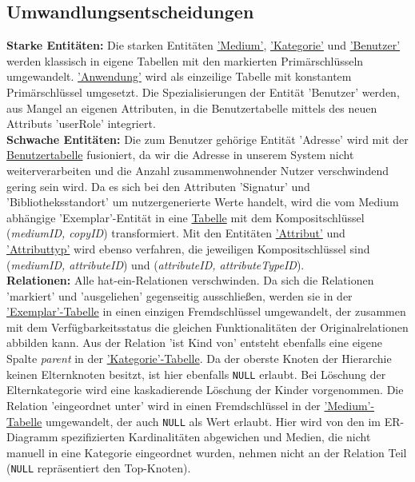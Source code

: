 \documentclass{article}
\begin{document}
\subsection{Umwandlungsentscheidungen}
\textbf{Starke Entitäten:} Die starken Entitäten \hyperlink{Medium}{'Medium'}, \hyperlink{Category}{'Kategorie'} und \hyperlink{User}{'Benutzer'} werden klassisch in eigene Tabellen mit den markierten Primärschlüsseln umgewandelt. \hyperlink{Application}{'Anwendung'} wird als einzeilige Tabelle mit konstantem Primärschlüssel umgesetzt. Die Spezialisierungen der Entität 'Benutzer' werden, aus Mangel an eigenen Attributen, in die Benutzertabelle mittels des neuen Attributs 'userRole' integriert. \\
\textbf{Schwache Entitäten:} Die zum Benutzer gehörige Entität 'Adresse' wird mit der \hyperlink{User}{Benutzertabelle} fusioniert, da wir die Adresse in unserem System nicht weiterverarbeiten und die Anzahl zusammenwohnender Nutzer verschwindend gering sein wird. Da es sich bei den Attributen 'Signatur' und 'Bibliotheksstandort' um nutzergenerierte Werte handelt, wird die vom Medium abhängige 'Exemplar'-Entität in eine \hyperlink{Copy}{Tabelle} mit dem Kompositschlüssel (\textit{mediumID, copyID}) transformiert. Mit den Entitäten \hyperlink{CustomAttribute}{'Attribut'} und \hyperlink{AttributeType}{'Attributtyp'} wird ebenso verfahren, die jeweiligen Kompositschlüssel sind (\textit{mediumID, attributeID}) und (\textit{attributeID, attributeTypeID}). \\
\textbf{Relationen:} Alle hat-ein-Relationen verschwinden. Da sich die Relationen 'markiert' und 'ausgeliehen' gegenseitig ausschließen, werden sie in der \hyperlink{Copy}{'Exemplar'-Tabelle} in einen einzigen Fremdschlüssel umgewandelt, der zusammen mit dem Verfügbarkeitsstatus die gleichen Funktionalitäten der Originalrelationen abbilden kann. Aus der Relation 'ist Kind von' entsteht ebenfalls eine eigene Spalte \textit{parent} in der \hyperlink{Category}{'Kategorie'-Tabelle}. Da der oberste Knoten der Hierarchie keinen Elternknoten besitzt, ist hier ebenfalls \texttt{NULL} erlaubt. Bei Löschung der Elternkategorie wird eine kaskadierende Löschung der Kinder vorgenommen. Die Relation 'eingeordnet unter' wird in einen Fremdschlüssel in der \hyperlink{Medium}{'Medium'-Tabelle} umgewandelt, der auch \texttt{NULL} als Wert erlaubt. Hier wird von den im ER-Diagramm spezifizierten Kardinalitäten abgewichen und Medien, die nicht manuell in eine Kategorie eingeordnet wurden, nehmen nicht an der Relation Teil (\texttt{NULL} repräsentiert den Top-Knoten). \\
\end{document}
